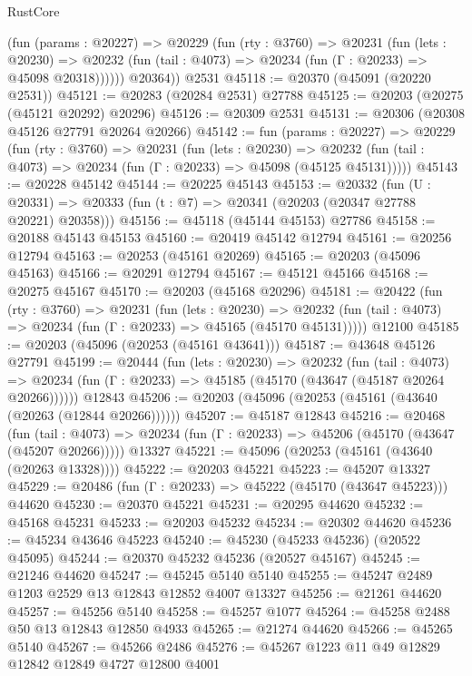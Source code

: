 \begin{lexlean}{RustCore}
\begin{coremodule}
          (fun (params : @20227) =>
          @20229
            (fun (rty : @3760) =>
            @20231
              (fun (lets : @20230) =>
              @20232 (fun (tail : @4073) => @20234 (fun (Γ : @20233) => @45098 @20318))))))
        @20364))
    @2531
@45118 := @20370 (@45091 (@20220 @2531))
@45121 := @20283 (@20284 @2531) @27788
@45125 := @20203 (@20275 (@45121 @20292) @20296)
@45126 := @20309 @2531
@45131 := @20306 (@20308 @45126 @27791 @20264 @20266)
@45142 := fun (params : @20227) =>
  @20229
    (fun (rty : @3760) =>
    @20231
      (fun (lets : @20230) =>
      @20232 (fun (tail : @4073) => @20234 (fun (Γ : @20233) => @45098 (@45125 @45131)))))
@45143 := @20228 @45142
@45144 := @20225 @45143
@45153 := @20332
    (fun (U : @20331) => @20333 (fun (t : @7) => @20341 (@20203 (@20347 @27788 @20221) @20358)))
@45156 := @45118 (@45144 @45153) @27786
@45158 := @20188 @45143 @45153
@45160 := @20419 @45142 @12794
@45161 := @20256 @12794
@45163 := @20253 (@45161 @20269)
@45165 := @20203 (@45096 @45163)
@45166 := @20291 @12794
@45167 := @45121 @45166
@45168 := @20275 @45167
@45170 := @20203 (@45168 @20296)
@45181 := @20422
    (fun (rty : @3760) =>
    @20231
      (fun (lets : @20230) =>
      @20232 (fun (tail : @4073) => @20234 (fun (Γ : @20233) => @45165 (@45170 @45131)))))
    @12100
@45185 := @20203 (@45096 (@20253 (@45161 @43641)))
@45187 := @43648 @45126 @27791
@45199 := @20444
    (fun (lets : @20230) =>
    @20232
      (fun (tail : @4073) =>
      @20234 (fun (Γ : @20233) => @45185 (@45170 (@43647 (@45187 @20264 @20266))))))
    @12843
@45206 := @20203 (@45096 (@20253 (@45161 (@43640 (@20263 (@12844 @20266))))))
@45207 := @45187 @12843
@45216 := @20468
    (fun (tail : @4073) => @20234 (fun (Γ : @20233) => @45206 (@45170 (@43647 (@45207 @20266)))))
    @13327
@45221 := @45096 (@20253 (@45161 (@43640 (@20263 @13328))))
@45222 := @20203 @45221
@45223 := @45207 @13327
@45229 := @20486 (fun (Γ : @20233) => @45222 (@45170 (@43647 @45223))) @44620
@45230 := @20370 @45221
@45231 := @20295 @44620
@45232 := @45168 @45231
@45233 := @20203 @45232
@45234 := @20302 @44620
@45236 := @45234 @43646 @45223
@45240 := @45230 (@45233 @45236) (@20522 @45095)
@45244 := @20370 @45232 @45236 (@20527 @45167)
@45245 := @21246 @44620
@45247 := @45245 @5140 @5140
@45255 := @45247 @2489 @1203 @2529 @13 @12843 @12852 @4007 @13327
@45256 := @21261 @44620
@45257 := @45256 @5140
@45258 := @45257 @1077
@45264 := @45258 @2488 @50 @13 @12843 @12850 @4933
@45265 := @21274 @44620
@45266 := @45265 @5140
@45267 := @45266 @2486
@45276 := @45267 @1223 @11 @49 @12829 @12842 @12849 @4727 @12800 @4001

\end{coremodule}
\end{lexlean}
